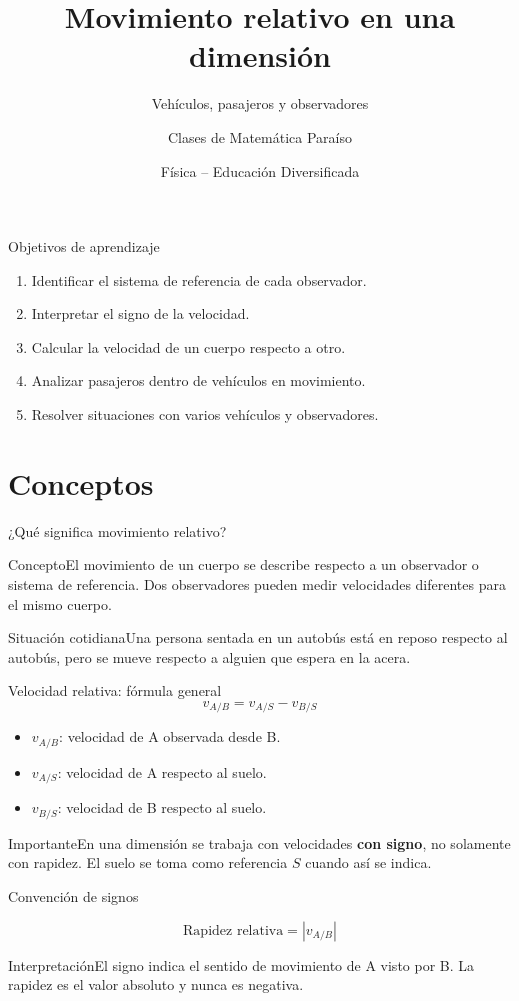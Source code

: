 \documentclass[aspectratio=169,10pt]{beamer}
\title{Movimiento relativo en una dimensión}\subtitle{Vehículos, pasajeros y observadores}\author{Clases de Matemática Paraíso}\date{Física -- Educación Diversificada}
\begin{document}
\begin{frame}\titlepage\end{frame}
\begin{frame}{Objetivos de aprendizaje}\begin{enumerate}\item Identificar el sistema de referencia de cada observador.\item Interpretar el signo de la velocidad.\item Calcular la velocidad de un cuerpo respecto a otro.\item Analizar pasajeros dentro de vehículos en movimiento.\item Resolver situaciones con varios vehículos y observadores.\end{enumerate}\end{frame}
\section{Conceptos}
\begin{frame}{¿Qué significa movimiento relativo?}\begin{block}{Concepto}El movimiento de un cuerpo se describe respecto a un observador o sistema de referencia. Dos observadores pueden medir velocidades diferentes para el mismo cuerpo.\end{block}\begin{exampleblock}{Situación cotidiana}Una persona sentada en un autobús está en reposo respecto al autobús, pero se mueve respecto a alguien que espera en la acera.\end{exampleblock}\end{frame}
\begin{frame}{Velocidad relativa: fórmula general}\[\boxed{v_{A/B}=v_{A/S}-v_{B/S}}\]\begin{itemize}\item $v_{A/B}$: velocidad de A observada desde B.\item $v_{A/S}$: velocidad de A respecto al suelo.\item $v_{B/S}$: velocidad de B respecto al suelo.\end{itemize}\begin{block}{Importante}En una dimensión se trabaja con velocidades \textbf{con signo}, no solamente con rapidez. El suelo se toma como referencia $S$ cuando así se indica.\end{block}\end{frame}
\begin{frame}{Convención de signos}\begin{center}\end{center}\[\text{Rapidez relativa}=|v_{A/B}|\]\begin{block}{Interpretación}El signo indica el sentido de movimiento de A visto por B. La rapidez es el valor absoluto y nunca es negativa.\end{block}\end{frame}
\end{document}
